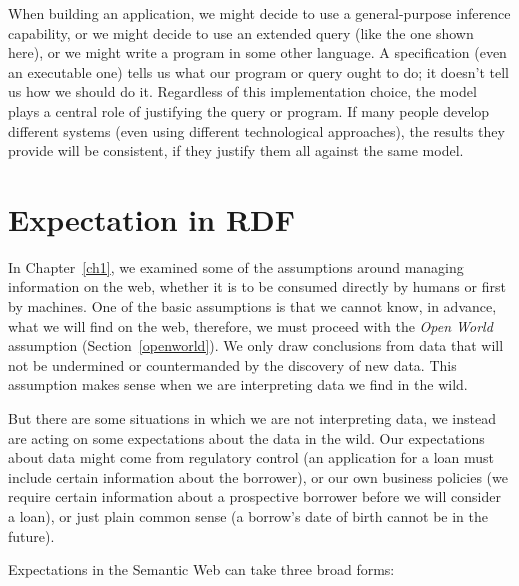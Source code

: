 When building an application, we might decide to use a general-purpose
inference capability, or we might decide to use an extended query (like
the one shown here), or we might write a program in some other language.
A specification (even an executable one) tells us what our program or
query ought to do; it doesn't tell us how we should do it. Regardless of
this implementation choice, the model plays a central role of justifying
the query or program. If many people develop different systems (even
using different technological approaches), the results they provide will
be consistent, if they justify them all against the same model.


\section{Expectation in RDF}


In Chapter~\ref{ch1}, we examined some of the assumptions around managing information on the web, 
whether it is to be consumed directly by humans or first by machines.  One of the basic assumptions is
that we cannot know, in advance, what we will find on the web, therefore, we must proceed with the \emph{Open World} assumption (Section~\ref{openworld}).  We only draw conclusions from data that will not be undermined or countermanded by the discovery of new data.  This assumption makes sense when we are interpreting data we find in the wild.

But there are some situations in which we are not interpreting data, we instead are acting on some expectations about the
data in the wild.  Our expectations about data might come from regulatory control (an application for a loan must
include certain information about the borrower), or our own business policies (we require certain information about a
prospective borrower before we will consider a loan), or just plain common sense (a borrow's date of birth cannot be in
the future).

Expectations in the Semantic Web can take three broad forms:

